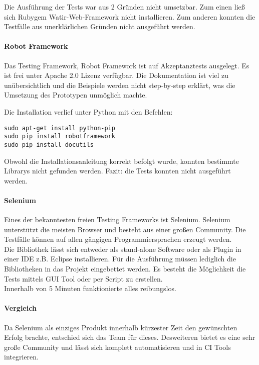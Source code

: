 Die Ausführung der Tests war aus 2 Gründen nicht umsetzbar. Zum einen ließ sich Rubygem Watir-Web-Framework nicht installieren. Zum anderen konnten die Testfälle aus unerklärlichen Gründen nicht ausgeführt werden.

\paragraph{Robot Framework}
Das Testing Framework, Robot Framework ist auf Akzeptanztests ausgelegt. Es ist frei unter Apache 2.0 Lizenz verfügbar. Die Dokumentation ist viel zu unübersichtlich und die Beispiele werden nicht step-by-step erklärt, was die Umsetzung des Prototypen unmöglich machte. \cite{ROBOTFRAMEWORK}

Die Installation verlief unter Python mit den Befehlen:
\begin{lstlisting}[caption={Installation von Robot Framework \cite{ROBOTFRAMEWORKINSTALL}}]
sudo apt-get install python-pip
sudo pip install robotframework
sudo pip install docutils
\end{lstlisting}

Obwohl die Installationsanleitung korrekt befolgt wurde, konnten bestimmte Librarys nicht gefunden werden. Fazit: die Tests konnten nicht ausgeführt werden. 
\paragraph{Selenium}
Eines der bekanntesten freien Testing Frameworks ist Selenium. Selenium unterstützt die meisten Browser und besteht aus einer großen Community. Die Testfälle können auf allen gängigen Programmiersprachen erzeugt werden.\\

Die Bibliothek lässt sich entweder als stand-alone Software oder als Plugin in einer IDE z.B. Eclipse installieren. Für die Ausführung müssen lediglich die Bibliotheken in das Projekt eingebettet werden. Es besteht die Möglichkeit die Tests mittels GUI Tool oder per Script zu erstellen.\\
Innerhalb von 5 Minuten funktionierte alles reibungslos.

\paragraph{Vergleich}
Da Selenium als einziges Produkt innerhalb kürzester Zeit den gewünschten Erfolg brachte, entschied sich das Team für dieses. Desweiteren bietet es eine sehr große Community und lässt sich komplett automatisieren und in CI Tools integrieren.